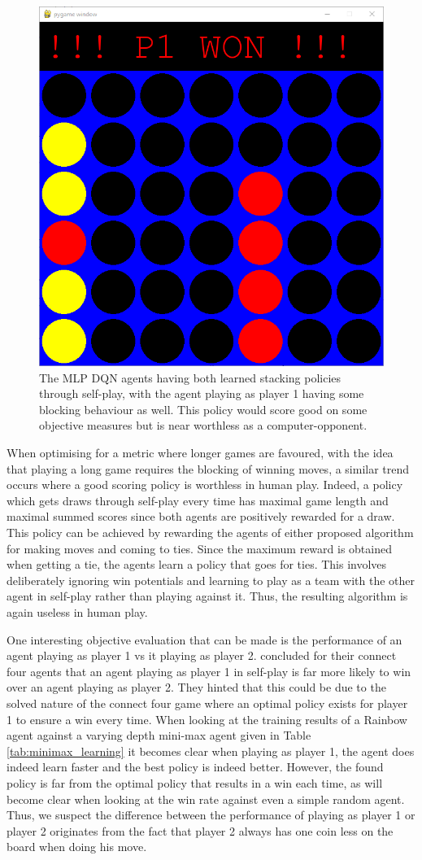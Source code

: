 \begin{figure}[ht]
    \centering
    \includegraphics[width=0.4\linewidth]{images/naive_policy.png}
    \captionsetup{width=0.9\linewidth}
    \captionsetup{justification=centering}
    \caption{The MLP DQN agents having both learned stacking policies through self-play, with the agent playing as player 1 having some blocking behaviour as well. This policy would score good on some objective measures but is near worthless as a computer-opponent.}
    \label{fig:stacking_behaviour}
\end{figure}

When optimising for a metric where longer games are favoured, with the idea that playing a long game requires the blocking of winning moves, a similar trend occurs where a good scoring policy is worthless in human play.
Indeed, a policy which gets draws through self-play every time has maximal game length and maximal summed scores since both agents are positively rewarded for a draw.
This policy can be achieved by rewarding the agents of either proposed algorithm for making moves and coming to ties.
Since the maximum reward is obtained when getting a tie, the agents learn a policy that goes for ties.
This involves deliberately ignoring win potentials and learning to play as a team with the other agent in self-play rather than playing against it.
Thus, the resulting algorithm is again useless in human play. 

One interesting objective evaluation that can be made is the performance of an agent playing as player 1 vs it playing as player 2.
 concluded for their connect four agents that an agent playing as player 1 in self-play is far more likely to win over an agent playing as player 2.
They hinted that this could be due to the solved nature of the connect four game where an optimal policy exists for player 1 to ensure a win every time.
When looking at the training results of a Rainbow agent against a varying depth mini-max agent given in Table \ref{tab:minimax_learning} it becomes clear when playing as player 1, the agent does indeed learn faster and the best policy is indeed better.
However, the found policy is far from the optimal policy that results in a win each time, as will become clear when looking at the win rate against even a simple random agent.
Thus, we suspect the difference between the performance of playing as player 1 or player 2 originates from the fact that player 2 always has one coin less on the board when doing his move.

